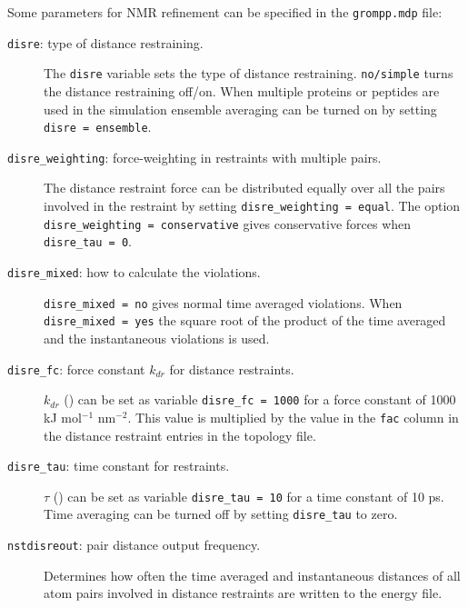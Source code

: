 Some parameters for NMR refinement can be specified in the
{\tt grompp.mdp} file:
\begin{description}
\item[{\tt disre}: type of distance restraining.]
	The {\tt disre} variable sets the type of distance restraining.
	{\tt no/simple} turns the distance restraining off/on.
 	When multiple proteins or peptides are used
	in the simulation ensemble averaging 
	can be turned on by setting {\tt disre = ensemble}.
\item[{\tt disre\_weighting}: force-weighting in restraints with
	 multiple pairs.]
	The distance restraint force can be distributed equally
	over all the pairs involved in the restraint by setting
	{\tt disre\_weighting = equal}.
	The option {\tt disre\_weighting = conservative}
	gives conservative forces when {\tt disre\_tau = 0}.
\item[{\tt disre\_mixed}: how to calculate the violations.]
	{\tt disre\_mixed = no} gives normal time averaged violations.
	When {\tt disre\_mixed = yes} the square root of the
	product of the time averaged and the instantaneous
	violations is used.
\item[{\tt disre\_fc}: force constant $k_{dr}$ for distance restraints.] 
	$k_{dr}$  () can be set
	as variable {\tt disre\_fc = 1000} for a force constant of
	1000 {kJ mol$^{-1}$ nm$^{-2}$}. This value is multiplied by
	the value in the {\tt fac} column in the distance restraint
	entries in the topology file.
\item[{\tt disre\_tau}: time constant for restraints.] 
	$\tau$ () can be set
	as variable {\tt disre\_tau = 10} for a time constant of
	10 ps. Time averaging can be turned off by setting {\tt disre\_tau}
	to zero.
\item[{\tt nstdisreout}: pair distance output frequency.]
	Determines how often the time averaged and 
	instantaneous distances of all atom pairs involved in
	distance restraints are written to the energy file.
\end{description}

